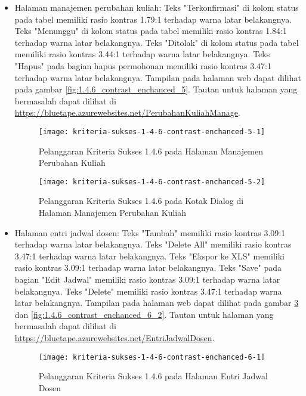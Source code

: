 \begin{itemize}
    \item Halaman manajemen perubahan kuliah: Teks "Terkonfirmasi" di kolom status pada tabel memiliki rasio kontras 1.79:1 terhadap warna latar belakangnya. Teks "Menunggu" di kolom status pada tabel memiliki rasio kontras 1.84:1 terhadap warna latar belakangnya. Teks "Ditolak" di kolom status pada tabel memiliki rasio kontras 3.44:1 terhadap warna latar belakangnya. Teks "Hapus" pada bagian hapus permohonan memiliki rasio kontras 3.47:1 terhadap warna latar belakangnya. Tampilan pada halaman web dapat dilihat pada gambar \ref{fig:1.4.6_contrast_enchanced_5}. Tautan untuk halaman yang bermasalah dapat dilihat di \url{https://bluetape.azurewebsites.net/PerubahanKuliahManage}.
    \begin{figure}[H]
        \centering  
        \texttt{[image: kriteria-sukses-1-4-6-contrast-enchanced-5-1]}  
        \caption[Pelanggaran Kriteria Sukses 1.4.6 pada Halaman Manajemen Perubahan Kuliah]{Pelanggaran Kriteria Sukses 1.4.6 pada Halaman Manajemen Perubahan Kuliah}
        \label{fig:1.4.6_contrast_enchanced_5_1}  
    \end{figure} 
    
    \begin{figure}[H]
        \centering  
        \texttt{[image: kriteria-sukses-1-4-6-contrast-enchanced-5-2]}  
        \caption[Pelanggaran Kriteria Sukses 1.4.6 pada Kotak Dialog di Halaman Manajemen Perubahan Kuliah]{Pelanggaran Kriteria Sukses 1.4.6 pada Kotak Dialog di Halaman Manajemen Perubahan Kuliah}
        \label{fig:1.4.6_contrast_enchanced_5_2}  
    \end{figure}

    \item Halaman entri jadwal dosen: Teks "Tambah" memiliki rasio kontras 3.09:1 terhadap warna latar belakangnya. Teks "Delete All" memiliki rasio kontras 3.47:1 terhadap warna latar belakangnya. Teks "Ekspor ke XLS" memiliki rasio kontras 3.09:1 terhadap warna latar belakangnya. Teks "Save" pada bagian "Edit Jadwal" memiliki rasio kontras 3.09:1 terhadap warna latar belakangnya. Teks "Delete" memiliki rasio kontras 3.47:1 terhadap warna latar belakangnya. Tampilan pada halaman web dapat dilihat pada gambar \ref{fig:1.4.6_contrast_enchanced_6_1} dan \ref{fig:1.4.6_contrast_enchanced_6_2}. Tautan untuk halaman yang bermasalah dapat dilihat di \url{https://bluetape.azurewebsites.net/EntriJadwalDosen}.
    \begin{figure}[H]
        \centering  
        \texttt{[image: kriteria-sukses-1-4-6-contrast-enchanced-6-1]}  
        \caption[Pelanggaran Kriteria Sukses 1.4.6 pada Halaman Entri Jadwal Dosen]{Pelanggaran Kriteria Sukses 1.4.6 pada Halaman Entri Jadwal Dosen}
        \label{fig:1.4.6_contrast_enchanced_6_1}  
    \end{figure} 
    

\end{itemize}
